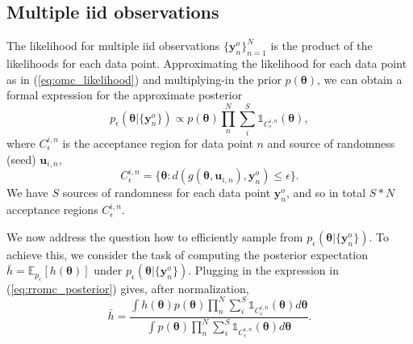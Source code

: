 \documentclass[twoside]{article}
\newcommand{\thb}{\boldsymbol{\theta}}
\newcommand{\ub}{\mathbf{u}}
\newcommand{\data}{\mathbf{y}^o}
\newcommand{\E}{\mathbb{E}}
\begin{document}
\subsection{Multiple iid observations}
\label{subsec:multiple-observations}
The likelihood for multiple iid observations $\{\data_n\}_{n=1}^N$ is the product of the likelihoods for each data point. Approximating the likelihood for each data point as in (\ref{eq:omc_likelihood}) and multiplying-in the prior $p(\thb)$, we can obtain a formal expression for the approximate posterior
\begin{equation}
  \label{eq:rromc_posterior}
  p_{\epsilon}(\thb | \{\data_n\}) \propto p(\thb) \prod_{n}^{N} \sum_{i}^S \mathbb{1}_{C_{\epsilon}^{i,n}}(\thb),
\end{equation}
where $C_{\epsilon}^{i,n}$ is the acceptance region for data point $n$ and source of randomness (seed) $\ub_{i,n}$,
\begin{equation}
C_{\epsilon}^{i,n} = \{\thb : d(g(\thb, \ub_{i,n}), \data_n) \leq \epsilon \}.
\end{equation}
We have $S$ sources of randomness for each data point $\data_n$, and so in total $S*N$ acceptance regions $C_{\epsilon}^{i,n}$.

We now address the question how to efficiently sample from $p_{\epsilon}(\thb | \{\data_n\})$. To achieve this, we consider the task of computing the posterior expectation $\bar{h} = \E_{p_{\epsilon}}[h(\thb)]$ under $p_{\epsilon}(\thb | \{\data_n\})$. Plugging in the expression in (\ref{eq:rromc_posterior}) gives, after normalization,
\begin{equation}
  \label{eq:rromc_expectation}
  \bar{h} = \frac{ \int h(\thb) p(\thb) \prod_n^N \sum_i^S \mathbb{1}_{C_{\epsilon}^{i,n}}(\thb) d\thb}{\int p(\thb) \prod_n^N \sum_i^S \mathbb{1}_{C_{\epsilon}^{i,n}}(\thb) d\thb}.
\end{equation}
%
%
\end{document}
